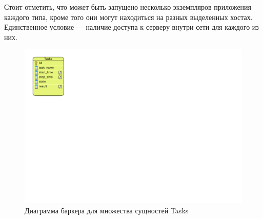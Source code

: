 Стоит отметить, что может быть запущено несколько экземпляров приложения каждого типа, кроме того они могут находиться
на разных выделенных хостах. Единственное условие --- наличие доступа к серверу внутри сети для каждого из них.

\begin{figure}[!ht]
\begin{center}
\vspace{-0.5cm}
\hspace{20cm}
\includegraphics[scale=0.9, trim=10mm 143mm 240mm 10mm, clip]{../resources/uml/Tasks_db.pdf}
\caption{Диаграмма баркера для множества сущностей Tasks}
\label{gr:tasks_db}
\end{center}
\end{figure} 

